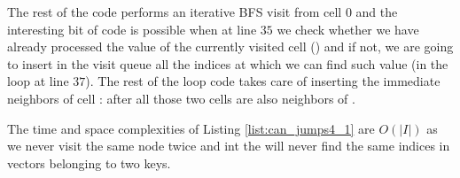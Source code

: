 The rest of the code performs an iterative BFS visit from cell $0$ and the interesting bit of code is possible when at line $35$ we check whether we have already processed the value of the currently visited cell () and if not, we are going to insert in the visit queue all the indices at which we can find such value (in the loop at line $37$).
The rest of the loop code takes care of inserting the immediate neighbors of cell : after all those two cells are also neighbors of .

The time and space complexities of Listing \ref{list:can_jumps4_1} are $O(|I|)$ as we never visit the same node twice and int the  will never find the same indices in vectors belonging to two keys.


